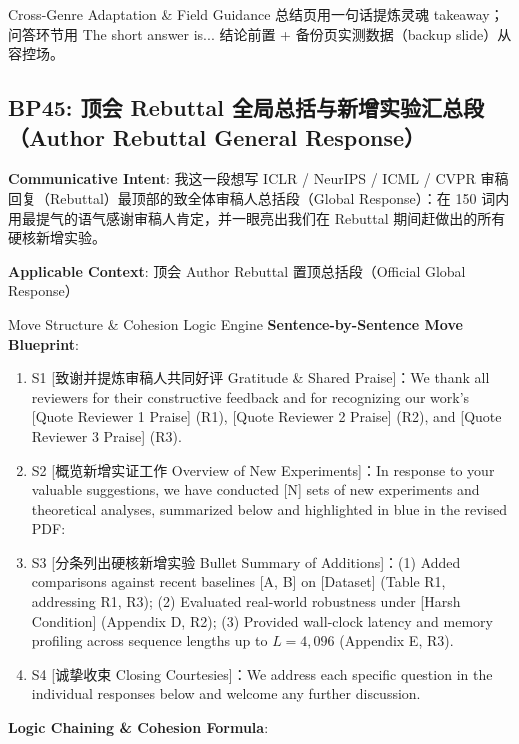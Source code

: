 \endgroup
\vspace{4pt}
\begin{TipBox}{Cross-Genre Adaptation \& Field Guidance}
总结页用一句话提炼灵魂 takeaway；问答环节用 The short answer is... 结论前置 + 备份页实测数据（backup slide）从容控场。
\end{TipBox}
\vspace{8pt}
\subsection{BP45: 顶会 Rebuttal 全局总括与新增实验汇总段（Author Rebuttal General Response）}\label{sec:bp:BP45}
\noindent\textbf{\color{AcadNavy}Communicative Intent}: 我这一段想写 ICLR / NeurIPS / ICML / CVPR 审稿回复（Rebuttal）最顶部的致全体审稿人总括段（Global Response）：在 150 词内用最提气的语气感谢审稿人肯定，并一眼亮出我们在 Rebuttal 期间赶做出的所有硬核新增实验。\par\vspace{2pt}
\noindent\textbf{\color{AcadSlate}Applicable Context}: 顶会 Author Rebuttal 置顶总括段（Official Global Response）\par\vspace{4pt}
\begin{ConceptBox}{Move Structure \& Cohesion Logic Engine}
\textbf{Sentence-by-Sentence Move Blueprint}:
\begin{enumerate}[label=\textbf{\color{AcadNavy}S\arabic*.}, leftmargin=2em, itemsep=2pt]
  \item S1 [致谢并提炼审稿人共同好评 Gratitude \& Shared Praise]：We thank all reviewers for their constructive feedback and for recognizing our work's [Quote Reviewer 1 Praise] (R1), [Quote Reviewer 2 Praise] (R2), and [Quote Reviewer 3 Praise] (R3).
  \item S2 [概览新增实证工作 Overview of New Experiments]：In response to your valuable suggestions, we have conducted [N] sets of new experiments and theoretical analyses, summarized below and highlighted in blue in the revised PDF:
  \item S3 [分条列出硬核新增实验 Bullet Summary of Additions]：(1) Added comparisons against recent baselines [A, B] on [Dataset] (Table R1, addressing R1, R3); (2) Evaluated real-world robustness under [Harsh Condition] (Appendix D, R2); (3) Provided wall-clock latency and memory profiling across sequence lengths up to $L=4,096$ (Appendix E, R3).
  \item S4 [诚挚收束 Closing Courtesies]：We address each specific question in the individual responses below and welcome any further discussion.
\end{enumerate}\par\vspace{4pt}
\textbf{Logic Chaining \& Cohesion Formula}:\par{}
\end{ConceptBox}
